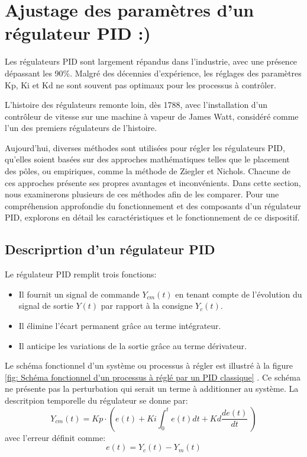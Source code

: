 \section{Ajustage des paramètres d'un régulateur PID :)}

Les régulateurs PID sont largement répandus dans l'industrie, avec une présence dépassant les 90\%. Malgré des décennies d'expérience, les réglages des paramètres Kp, Ki et Kd ne sont souvent pas optimaux pour les processus à contrôler.

L'histoire des régulateurs remonte loin, dès 1788, avec l'installation d'un contrôleur de vitesse sur une machine à vapeur de James Watt, considéré comme l'un des premiers régulateurs de l'histoire.

Aujourd'hui, diverses méthodes sont utilisées pour régler les régulateurs PID, qu'elles soient basées sur des approches mathématiques telles que le placement des pôles, ou empiriques, comme la méthode de Ziegler et Nichols. Chacune de ces approches présente ses propres avantages et inconvénients. Dans cette section, nous examinerons plusieurs de ces méthodes afin de les comparer. Pour une compréhension approfondie du fonctionnement et des composants d'un régulateur PID, explorons en détail les caractéristiques et le fonctionnement de ce dispositif.

\subsection{Descriprtion d'un régulateur PID}

Le régulateur PID remplit trois fonctions:
\begin{itemize}
	\item Il fournit un signal de commande $Y_{cm}(t)$ en tenant compte de l'évolution du signal de sortie $Y(t)$ par rapport à la consigne $Y_c(t)$.
	\item Il élimine l'écart permanent grâce au terme intégrateur.
	\item Il anticipe les variations de la sortie grâce au terme dérivateur.
\end{itemize}
Le schéma fonctionnel d'un système ou processus à régler est illustré à la figure \ref{fig: Schéma fonctionnel d'un processus à réglé par un PID classique} . Ce schéma ne présente pas la perturbation qui serait un terme à additionner au système. La descritpion temporelle du régulateur se donne par:
\begin{equation}
	Y_{cm}(t)=Kp\cdot  \left( e(t)+Ki\int_{0}^{t}e(t)dt+Kd\frac{de(t)}{dt} \ \right)
	\label{eq: PID temporel}
\end{equation}
avec l'erreur définit comme:
\begin{equation}
	e(t)=Y_c(t)-Y_m(t)
	\label{eq: erreur}
\end{equation}

